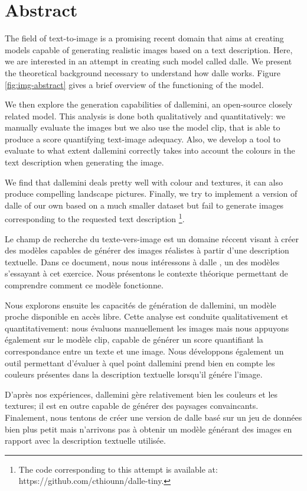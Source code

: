 \documentclass{article}
\begin{document}
\pagebreak
\section{Abstract}


\begin{paracol}{2}
\setlength{\columnsep}{1cm}
\setlength{\columnseprule}{1pt}

The field of text-to-image is a promising recent domain that aims at creating models capable of generating realistic images based on a text description. Here, we are interested in an attempt in creating such model called \gls{dalle}. We present the theoretical background necessary to understand how \gls{dalle} works. Figure \ref{fig:img-abstract} gives a brief overview of the functioning of the model. 

We then explore the generation capabilities of \gls{dallemini}, an open-source closely related model. This analysis is done both qualitatively and quantitatively: we manually evaluate the images but we also  use the model \gls{clip}, that is able to produce a score quantifying text-image adequacy. Also, we develop a tool to evaluate to what extent \gls{dallemini} correctly takes into account the colours in the text description when generating the image. 

We find that \gls{dallemini} deals pretty well with colour and textures, it can also produce compelling landscape pictures. Finally, we try to implement a version of \gls{dalle} of our own based on a much smaller dataset but fail to generate images corresponding to the requested text description \footnote{The code corresponding to this attempt is available at: https://github.com/cthiounn/dalle-tiny.}.

\switchcolumn

Le champ de recherche du texte-vers-image est un domaine réccent visant à créer des modèles capables de générer des images réalistes à partir d'une description textuelle. Dans ce document, nous nous intéressons à \gls{dalle} , un des modèles s'essayant à cet exercice. Nous présentons le contexte théorique permettant de comprendre comment ce modèle fonctionne. 

Nous explorons ensuite les capacités de génération de \gls{dallemini}, un modèle proche disponible en accès libre. Cette analyse est conduite qualitativement et quantitativement: nous évaluons manuellement les images mais nous appuyons également sur le modèle \gls{clip}, capable de générer un score quantifiant la correspondance entre un texte et une image. Nous développons également un outil permettant d'évaluer à quel point \gls{dallemini} prend bien en compte les couleurs présentes dans la description textuelle lorsqu'il génére l'image. 

D'après nos expériences, \gls{dallemini} gère relativement bien les couleurs et les textures; il est en outre capable de générer des paysages convaincants. Finalement, nous tentons de créer une version de \gls{dalle} basé sur un jeu de données bien plus petit mais n'arrivons pas à obtenir un modèle générant des images en rapport avec la description textuelle utilisée. 

\end{paracol}
\end{document}
